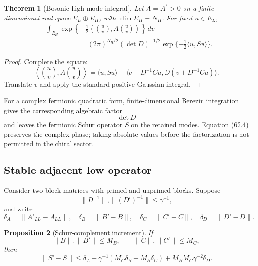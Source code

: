 \documentclass[11pt]{article}
\newtheorem{theorem}{Theorem}[section]
\newtheorem{proposition}[theorem]{Proposition}
\begin{document}
\begin{theorem}[Bosonic high-mode integral]
\label{thm:v11v62-gaussian}
Let \(A=A^*>0\) on a finite-dimensional real space
\(E_L\oplus E_H\), with \(\dim E_H=N_H\).  For fixed \(u\in E_L\),
\[
\begin{split}
 &\int_{E_H}
 \exp\left\{-\frac12
 \left\langle\binom uv,
 A\binom uv\right\rangle\right\}\,dv\\
 &\hspace{2cm}
 =(2\pi)^{N_H/2}(\det D)^{-1/2}
                    \exp\{-\tfrac12\langle u,Su\rangle\}.     \tag{62.7}
\end{split}
\]
\end{theorem}

\begin{proof}
Complete the square:
\[
 \left\langle\binom uv,A\binom uv\right\rangle
 =\langle u,Su\rangle+
   \langle v+D^{-1}Cu,D(v+D^{-1}Cu)\rangle.                  \tag{62.8}
\]
Translate \(v\) and apply the standard positive Gaussian integral.
\end{proof}

For a complex fermionic quadratic form, finite-dimensional Berezin
integration gives the corresponding algebraic factor
\[
                              \det D                           \tag{62.9}
\]
and leaves the fermionic Schur operator \(S\) on the retained modes.
Equation (62.4) preserves the complex phase; taking absolute values
before the factorization is not permitted in the chiral sector.

\subsection{Stable adjacent low operator}

Consider two block matrices with primed and unprimed blocks.  Suppose
\[
 \lVert D^{-1}\rVert,\lVert(D')^{-1}\rVert\le\gamma^{-1},     \tag{62.10}
\]
and write
\[
 \delta_A=\lVert A'_{LL}-A_{LL}\rVert,\quad
 \delta_B=\lVert B'-B\rVert,\quad
 \delta_C=\lVert C'-C\rVert,\quad
 \delta_D=\lVert D'-D\rVert.                                 \tag{62.11}
\]

\begin{proposition}[Schur-complement increment]
\label{prop:v11v62-increment}
If
\[
 \lVert B\rVert,\lVert B'\rVert\le M_B,\qquad
 \lVert C\rVert,\lVert C'\rVert\le M_C,                       \tag{62.12}
\]
then
\[
 \lVert S'-S\rVert
 \le\delta_A+\gamma^{-1}(M_C\delta_B+M_B\delta_C)
                   +M_BM_C\gamma^{-2}\delta_D.                \tag{62.13}
\]
\end{proposition}
\end{document}

